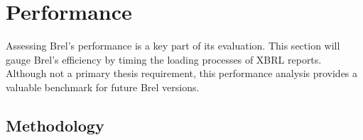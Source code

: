 \section{Performance}
\label{sec:performance}

Assessing Brel's performance is a key part of its evaluation.
This section will gauge Brel's efficiency by timing the loading processes of XBRL reports.
Although not a primary thesis requirement, this performance analysis
provides a valuable benchmark for future Brel versions.

\subsection{Methodology}


